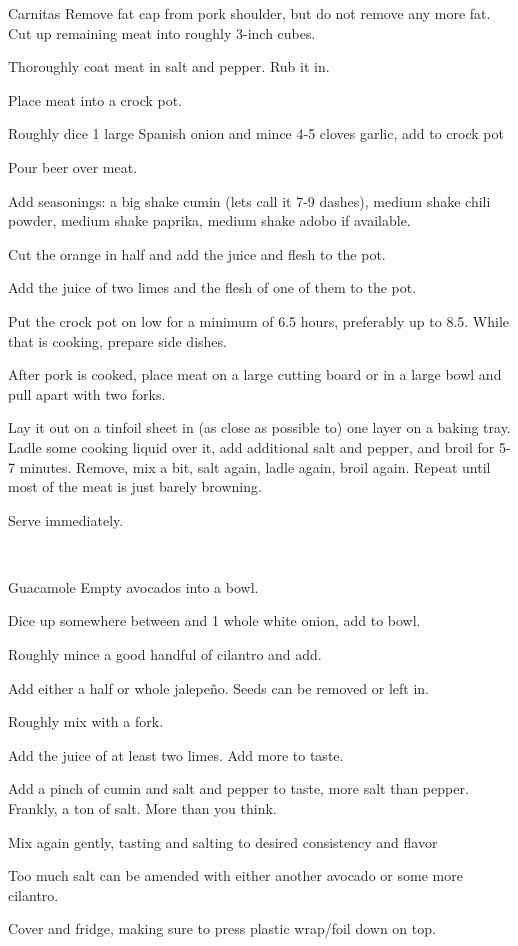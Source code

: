 \documentclass{article}
\newcommand{\threequarters}{\sfrac{3}{4}}
\newcounter{stepnum}
\newenvironment{method*}[2][]{%
\setcounter{stepnum}{0}
\noindent
{\color{MidnightBlue}\Large\textbf{Instructions: #2}}%
\par
\smallskip
\if###1##%
\else
\noindent
\emph{#1}
\par
\fi
\begingroup
\parindent0pt
\parskip0.25em
\leftskip2em
\everypar={\llap{\stepcounter{stepnum}\hbox to2em{\thestepnum.\hfill}}}
}{%
\par
\endgroup}
\begin{document}
\begin{method*}{Carnitas}
    Remove fat cap from pork shoulder, but do not remove any more fat. Cut up remaining meat into roughly 3-inch cubes.

    Thoroughly coat meat in salt and pepper. Rub it in.

    Place meat into a crock pot.

    Roughly dice 1 large Spanish onion
    and mince 4-5 cloves garlic, add to crock pot

    Pour beer over meat.

    Add seasonings: a big shake cumin (lets call it 7-9 dashes), medium shake chili powder, medium shake paprika, medium shake adobo if available.

    Cut the orange in half and add the juice and flesh to the pot.

    Add the juice of two limes and the flesh of one of them to the pot.

    Put the crock pot on low for a minimum of 6.5 hours, preferably up to 8.5. While that is cooking, prepare side dishes.

    After pork is cooked, place meat on a large cutting board or in a large bowl and pull apart with two forks.

    Lay it out on a tinfoil sheet in (as close as possible to) one layer on a baking tray. Ladle some cooking liquid over it, add additional salt and pepper, and broil for 5-7 minutes. Remove, mix a bit, salt again, ladle again, broil again. Repeat until most of the meat is just barely browning.

    Serve immediately.
\end{method*}
~\\
\begin{method*}{Guacamole}
    Empty avocados into a bowl.

    Dice up somewhere between \threequarters{} and 1 whole white onion, add to bowl.

    Roughly mince a good handful of cilantro and add.

    Add either a half or whole jalepe\~no. Seeds can be removed or left in.

    Roughly mix with a fork.

    Add the juice of at least two limes. Add more to taste.

    Add a pinch of cumin and salt and pepper to taste, more salt than pepper. Frankly, a ton of salt. More than you think.

    Mix again gently, tasting and salting to desired consistency and flavor

    Too much salt can be amended with either another avocado or some more cilantro.

    Cover and fridge, making sure to press plastic wrap/foil down on top.
\end{method*}
\end{document}
